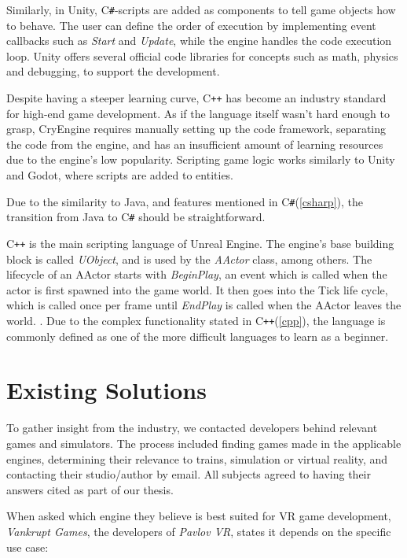 Similarly, in Unity, C\texttt{\#}-scripts are added as components to tell game objects how to behave. The user can define the order of execution by implementing event callbacks such as \textit{Start} and \textit{Update}, while the engine handles the code execution loop. Unity offers several official code libraries for concepts such as math, physics and debugging, to support the development. 

Despite having a steeper learning curve, C\texttt{++} has become an industry standard for high-end game development. As if the language itself wasn't hard enough to grasp, CryEngine requires manually setting up the code framework, separating the code from the engine, and has an insufficient amount of learning resources due to the engine's low popularity. Scripting game logic works similarly to Unity and Godot, where scripts are added to entities.

Due to the similarity to Java, and features mentioned in C\texttt{\#}(\ref{csharp}), the transition from Java to C\texttt{\#} should be straightforward.   

C\texttt{++} is the main scripting language of Unreal Engine. The engine's base building block is called \textit{UObject}, and is used by the \textit{AActor} class, among others. The lifecycle of an AActor starts with \textit{BeginPlay}, an event which is called when the actor is first spawned into the game world. It then goes into the Tick life cycle, which is called once per frame until \textit{EndPlay} is called when the AActor leaves the world. \cite{unreal_engine_documentation_2021}. Due to the complex functionality stated in C\texttt{++}(\ref{cpp}), the language is commonly defined as one of the more difficult languages to learn as a beginner.



\section{Existing Solutions}

To gather insight from the industry, we contacted developers behind relevant games and simulators. The process included finding games made in the applicable engines, determining their relevance to trains, simulation or virtual reality, and contacting their studio/author by email. All subjects agreed to having their answers cited as part of our thesis.

When asked which engine they believe is best suited for VR game development, \textit{Vankrupt Games}, the developers of \textit{Pavlov VR}, states it depends on the specific use case:


